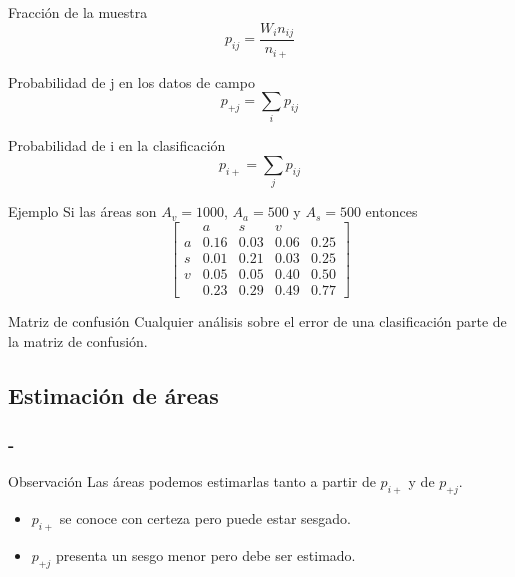 \documentclass[handout]{beamer}
\begin{document}
\begin{frame}{\subsecname}
  \begin{block}{Fracción de la muestra}
      $$p_{ij} = \frac{W_i n_{ij}}{n_{i+}}$$
  \end{block}\pause
  \begin{block}{Probabilidad de j en los datos de campo}
    $$p_{+j} = \sum_i p_{ij}$$
  \end{block}
  \begin{block}{Probabilidad de i en la clasificación}
    $$p_{i+} = \sum_j p_{ij}$$
  \end{block}
\end{frame}

\begin{frame}{\subsecname}
  \begin{exampleblock}{Ejemplo}
      Si las áreas son $A_v = 1000$, $A_a = 500$ y $A_s = 500$ entonces \pause
    \[
    \begin{bmatrix}
          & a   & s        & v    & \\
        a & 0.16  & 0.03   & 0.06 & 0.25 \\
        s & 0.01  & 0.21   & 0.03 & 0.25 \\
        v & 0.05  & 0.05   & 0.40 & 0.50 \\
          & 0.23  & 0.29   & 0.49 & 0.77
    \end{bmatrix} \]
  \end{exampleblock}
\end{frame}

\begin{frame}{\subsecname}
  \begin{block}{Matriz de confusión}
    Cualquier análisis sobre el error de una clasificación parte de la matriz de confusión.
  \end{block}
\end{frame}

\subsection{Estimación de áreas}

\begin{frame}
    \frametitle{\secname-\subsecname}
    \begin{block}{Observación}
        Las áreas podemos estimarlas tanto a partir de $p_{i+}$ y de
        $p_{+j}$.\pause
        \begin{itemize}
            \item $p_{i+}$ se conoce con certeza pero puede estar sesgado.
            \item $p_{+j}$ presenta un sesgo menor pero debe ser estimado.
        \end{itemize}
    \end{block}
\end{frame}
\end{document}

